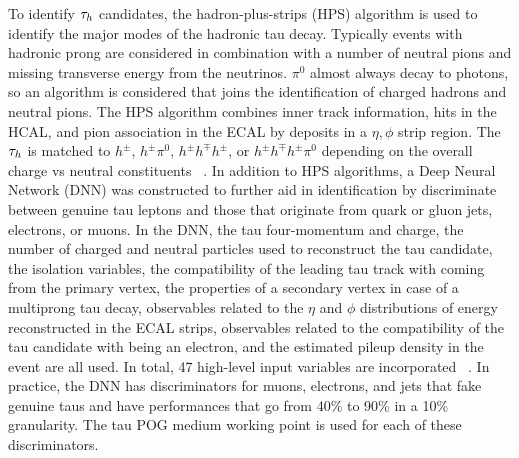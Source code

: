 To identify $\tau_h$ candidates, the hadron-plus-strips (HPS) algorithm is used to identify the major modes of the hadronic tau decay. Typically events with hadronic prong are considered in combination with a number of neutral pions and missing transverse energy from the neutrinos. $\pi^0$ almost always decay to photons, so an algorithm is considered that joins the identification of charged hadrons and neutral pions. The HPS algorithm combines inner track information, hits in the HCAL, and pion association in the ECAL by deposits in a $\eta,\phi$ strip region. 
The $\tau_h$ is matched to $h^{\pm}$, $h^{\pm}\pi^{0}$, $h^{\pm}h^{\mp}h^{\pm}$, or $h^{\pm}h^{\mp}h^{\pm}\pi^{0}$ depending on the overall charge vs neutral constituents ~\cite{Sirunyan:2018pgf}.
In addition to HPS algorithms, a Deep Neural Network (DNN) was constructed to further aid in identification by discriminate between genuine tau leptons and those that originate from quark or gluon jets, electrons, or muons.  
In the DNN, the tau four-momentum and charge,
the number of charged and neutral particles used to reconstruct the tau candidate,
the isolation variables,
the compatibility of the leading tau track with coming from the primary vertex,
the properties of a secondary vertex in case of a multiprong tau decay,
observables related to the $\eta$ and $\phi$ distributions of energy reconstructed in the ECAL strips,
observables related to the compatibility of the tau candidate with being an electron, 
and the estimated pileup density in the event are all used. In total, 47 high-level input variables are incorporated 
~\cite{https://doi.org/10.48550/arxiv.2201.08458}.
In practice, the DNN has discriminators for muons, electrons, and jets that fake genuine taus and have performances that go from 40\% to 90\% in a 10\% granularity. The tau POG medium working point is used for each of these discriminators. 


